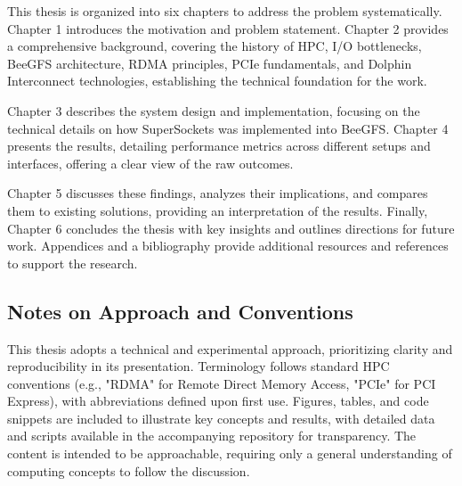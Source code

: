 This thesis is organized into six chapters to address the problem systematically. Chapter 1 introduces the motivation and problem statement. Chapter 2 provides a comprehensive background, covering the history of HPC, I/O bottlenecks, BeeGFS architecture, RDMA principles, PCIe fundamentals, and Dolphin Interconnect technologies, establishing the technical foundation for the work.

Chapter 3 describes the system design and implementation, focusing on the technical details on how SuperSockets was implemented into BeeGFS. Chapter 4 presents the results, detailing performance metrics across different setups and interfaces, offering a clear view of the raw outcomes.

Chapter 5 discusses these findings, analyzes their implications, and compares them to existing solutions, providing an interpretation of the results. Finally, Chapter 6 concludes the thesis with key insights and outlines directions for future work. Appendices and a bibliography provide additional resources and references to support the research.

\subsection{Notes on Approach and Conventions}

This thesis adopts a technical and experimental approach, prioritizing clarity and reproducibility in its presentation. Terminology follows standard HPC conventions (e.g., "RDMA" for Remote Direct Memory Access, "PCIe" for PCI Express), with abbreviations defined upon first use. Figures, tables, and code snippets are included to illustrate key concepts and results, with detailed data and scripts available in the accompanying repository for transparency. The content is intended to be approachable, requiring only a general understanding of computing concepts to follow the discussion.
